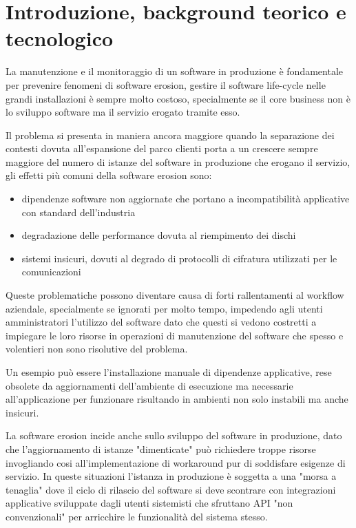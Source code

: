 \chapter{Introduzione, background teorico e tecnologico}

La manutenzione e il monitoraggio di un software in produzione è fondamentale per prevenire fenomeni di software erosion, gestire il software life-cycle nelle grandi installazioni è sempre molto costoso, specialmente se il core business non è lo sviluppo software ma il servizio erogato tramite esso.

Il problema si presenta in maniera ancora maggiore quando la separazione dei contesti dovuta all'espansione del parco clienti porta a un crescere sempre maggiore del numero di istanze del software in produzione che erogano il servizio, gli effetti più comuni della software erosion sono:

\begin{itemize}
    \item dipendenze software non aggiornate che portano a incompatibilità applicative con standard dell'industria
    \item degradazione delle performance dovuta al riempimento dei dischi
    \item sistemi insicuri, dovuti al degrado di protocolli di cifratura utilizzati per le comunicazioni
\end{itemize}

Queste problematiche possono diventare causa di forti rallentamenti al workflow aziendale, specialmente se ignorati per molto tempo, impedendo agli utenti amministratori l'utilizzo del software dato che questi si vedono costretti a impiegare le loro risorse in operazioni di manutenzione del software che spesso e volentieri non sono risolutive del problema.

Un esempio può essere l'installazione manuale di dipendenze applicative, rese obsolete da aggiornamenti dell'ambiente di esecuzione ma necessarie all'applicazione per funzionare risultando in ambienti non solo instabili ma anche insicuri.

La software erosion incide anche sullo sviluppo del software in produzione, dato che l'aggiornamento di istanze "dimenticate" può richiedere troppe risorse invogliando cosi all'implementazione di workaround pur di soddisfare esigenze di servizio. In queste situazioni l'istanza in produzione è soggetta a una "morsa a tenaglia" dove il ciclo di rilascio del software si deve scontrare con integrazioni applicative sviluppate dagli utenti sistemisti che sfruttano API "non convenzionali" per arricchire le funzionalità del sistema stesso.

